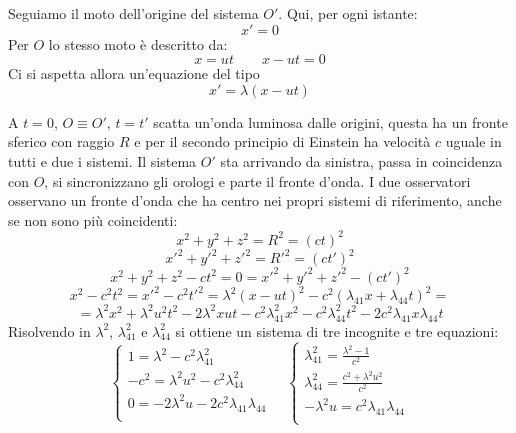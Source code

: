 \parbox[]{\textwidth}{
Seguiamo il moto dell'origine del sistema $O'$. Qui, per ogni istante:
\begin{equation*}x'=0\end{equation*}
Per $O$ lo stesso moto è descritto da:
\begin{equation*}x=ut\qquad x-ut=0\end{equation*}
Ci si aspetta allora un'equazione del tipo
\begin{equation*}x'=\lambda(x-ut)\end{equation*}
}

A $t=0$, $O\equiv O'$, $t=t'$ scatta un'onda luminosa dalle origini, questa ha un fronte sferico con raggio $R$ e per il secondo principio di Einstein ha velocità $c$ uguale in tutti e due i sistemi. Il sistema $O'$ sta arrivando da sinistra, passa in coincidenza con $O$, si sincronizzano gli orologi e parte il fronte d'onda. I due osservatori osservano un fronte d'onda che ha centro nei propri sistemi di riferimento, anche se non sono più coincidenti:
\begin{equation*}x^2+y^2+z^2=R^2=(ct)^2\end{equation*}
\begin{equation*}x'^2+y'^2+z'^2=R'^2=(ct')^2\end{equation*}
\begin{equation*}x^2+y^2+z^2-ct^2=0=x'^2+y'^2+z'^2-(ct')^2\end{equation*}
\begin{equation*}x^2-c^2t^2=x'^2-c^2t'^2=\lambda^2(x-ut)^2-c^2(\lambda_{41}x+\lambda_{44}t)^2=\end{equation*}
\begin{equation*}=\lambda^2x^2+\lambda^2 u^2t^2-2\lambda^2 xut-c^2\lambda_{41}^2x^2-c^2\lambda_{44}^2t^2-2c^2\lambda_{41} x\lambda_{44} t\end{equation*}
Risolvendo in $\lambda^2$, $\lambda_{41}^2$ e $\lambda_{44}^2$ si ottiene un sistema di tre incognite e tre equazioni:
\begin{equation*}\left\{
\begin{array}{l}
1=\lambda^2-c^2\lambda_{41}^2\\
-c^2=\lambda^2u^2-c^2\lambda_{44}^2\\
0=-2\lambda^2u-2c^2\lambda_{41}\lambda_{44}\\
\end{array}
\right.\quad \left\{
\begin{array}{l}
\lambda_{41}^2=\frac{\lambda^2-1}{c^2}\\
\lambda_{44}^2=\frac{c^2+\lambda^2u^2}{c^2}\\
-\lambda^2u=c^2\lambda_{41}\lambda_{44}\\

\end{array}\right.\end{equation*}
